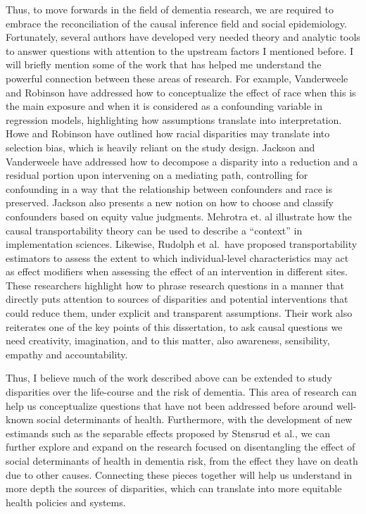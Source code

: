 \documentclass[
]{book}
\begin{document}
Thus, to move forwards in the field of dementia research, we are required to embrace the reconciliation of the causal inference field and social epidemiology. Fortunately, several authors have developed very needed theory and analytic tools to answer questions with attention to the upstream factors I mentioned before. I will briefly mention some of the work that has helped me understand the powerful connection between these areas of research. For example, Vanderweele and Robinson have addressed how to conceptualize the effect of race when this is the main exposure and when it is considered as a confounding variable in regression models, highlighting how assumptions translate into interpretation\autocite{vanderweele2014}. Howe and Robinson have outlined how racial disparities may translate into selection bias, which is heavily reliant on the study design\autocite{howe2018}. Jackson and Vanderweele have addressed how to decompose a disparity into a reduction and a residual portion upon intervening on a mediating path, controlling for confounding in a way that the relationship between confounders and race is preserved\autocite{jackson2018}. Jackson also presents a new notion on how to choose and classify confounders based on equity value judgments\autocite{jackson2020}. Mehrotra et. al illustrate how the causal transportability theory can be used to describe a ``context'' in implementation sciences\autocite{mehrotra2019}. Likewise, Rudolph et al.~have proposed transportability estimators to assess the extent to which individual-level characteristics may act as effect modifiers when assessing the effect of an intervention in different sites\autocite{rudolph2018}. These researchers highlight how to phrase research questions in a manner that directly puts attention to sources of disparities and potential interventions that could reduce them, under explicit and transparent assumptions. Their work also reiterates one of the key points of this dissertation, to ask causal questions we need creativity, imagination, and to this matter, also awareness, sensibility, empathy and accountability.

Thus, I believe much of the work described above can be extended to study disparities over the life-course and the risk of dementia. This area of research can help us conceptualize questions that have not been addressed before around well-known social determinants of health. Furthermore, with the development of new estimands such as the separable effects proposed by Stensrud et al.\autocite{stensrud2020,stensrud2021}, we can further explore and expand on the research focused on disentangling the effect of social determinants of health in dementia risk, from the effect they have on death due to other causes\autocite{mayeda2018,shaw2021}. Connecting these pieces together will help us understand in more depth the sources of disparities, which can translate into more equitable health policies and systems.
\newpage
\end{document}
